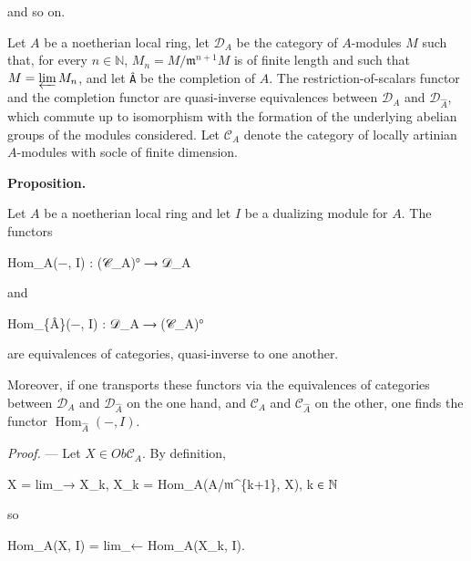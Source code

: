 \documentclass[
  11pt,
  a4paper,
]{book}
\newenvironment{Shaded}{}{}
\newcommand{\NormalTok}[1]{#1}
\begin{document}
and so on.

Let \(A\) be a noetherian local ring, let \(\mathcal{D}_{A}\) be the
category of \(A\)-modules \(M\) such that, for every \(n \in
\mathbb{N}\), \(M_{n} = M/\mathfrak{m}^{n+1}M\) is of finite length and
such that \(M = \varprojlim M_{n}\), and let \texttt{Â} be the
completion of \(A\). The restriction-of-scalars functor and the
completion functor are quasi-inverse equivalences between
\(\mathcal{D}_{A}\) and \(\mathcal{D}_{\hat{A}}\), which commute up to
isomorphism with the formation of the underlying abelian groups of the
modules considered. Let \(\mathcal{C}_{A}\) denote the category of
locally artinian \(A\)-modules with socle of finite dimension.

\textbf{Proposition.}

Let \(A\) be a noetherian local ring and let \(I\) be a dualizing module
for \(A\). The functors

\begin{Shaded}
\begin{Highlighting}[]
\NormalTok{Hom\_A(−, I) : (𝒞\_A)° ⟶ 𝒟\_A}
\end{Highlighting}
\end{Shaded}

and

\begin{Shaded}
\begin{Highlighting}[]
\NormalTok{Hom\_\{Â\}(−, I) : 𝒟\_A ⟶ (𝒞\_A)°}
\end{Highlighting}
\end{Shaded}

are equivalences of categories, quasi-inverse to one another.

Moreover, if one transports these functors via the equivalences of
categories between \(\mathcal{D}_{A}\) and \(\mathcal{D}_{\hat{A}}\) on
the one hand, and \(\mathcal{C}_{A}\) and \(\mathcal{C}_{\hat{A}}\) on
the other, one finds the functor \(\operatorname{Hom}_{\hat{A}}(-, I)\).

\emph{Proof.} --- Let \(X \in Ob \mathcal{C}_{A}\). By definition,

\begin{Shaded}
\begin{Highlighting}[]
\NormalTok{X = lim\_→ X\_k,    X\_k = Hom\_A(A/𝔪\^{}\{k+1\}, X),}
\NormalTok{                  k ∈ ℕ}
\end{Highlighting}
\end{Shaded}

so

\begin{Shaded}
\begin{Highlighting}[]
\NormalTok{Hom\_A(X, I) = lim\_← Hom\_A(X\_k, I).}
\end{Highlighting}
\end{Shaded}
\end{document}
